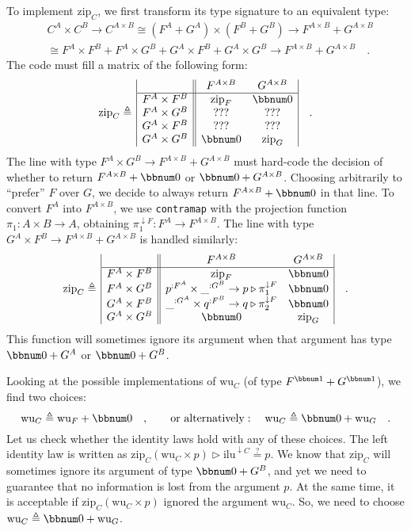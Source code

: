 To implement $\text{zip}_{C}$, we first transform its type signature
to an equivalent type:
\begin{align*}
 & C^{A}\times C^{B}\rightarrow C^{A\times B}\cong(F^{A}+G^{A})\times(F^{B}+G^{B})\rightarrow F^{A\times B}+G^{A\times B}\\
 & \cong F^{A}\times F^{B}+F^{A}\times G^{B}+G^{A}\times F^{B}+G^{A}\times G^{B}\rightarrow F^{A\times B}+G^{A\times B}\quad.
\end{align*}
The code must fill a matrix of the following form:
\[
\text{zip}_{C}\triangleq\,\begin{array}{|c||cc|}
 & F^{A\times B} & G^{A\times B}\\
\hline F^{A}\times F^{B} & \text{zip}_{F} & \bbnum 0\\
F^{A}\times G^{B} & \text{???} & \text{???}\\
G^{A}\times F^{B} & \text{???} & \text{???}\\
G^{A}\times G^{B} & \bbnum 0 & \text{zip}_{G}
\end{array}\quad.
\]
The line with type $F^{A}\times G^{B}\rightarrow F^{A\times B}+G^{A\times B}$
must hard-code the decision of whether to return $F^{A\times B}+\bbnum 0$
or $\bbnum 0+G^{A\times B}$. Choosing arbitrarily to \textsf{``}prefer\textsf{''}
$F$ over $G$, we decide to always return $F^{A\times B}+\bbnum 0$
in that line. To convert $F^{A}$ into $F^{A\times B}$, we use \lstinline!contramap!
with the projection function $\pi_{1}:A\times B\rightarrow A$, obtaining
$\pi_{1}^{\downarrow F}:F^{A}\rightarrow F^{A\times B}$. The line
with type $G^{A}\times F^{B}\rightarrow F^{A\times B}+G^{A\times B}$
is handled similarly:
\[
\text{zip}_{C}\triangleq\,\begin{array}{|c||cc|}
 & F^{A\times B} & G^{A\times B}\\
\hline F^{A}\times F^{B} & \text{zip}_{F} & \bbnum 0\\
F^{A}\times G^{B} & p^{:F^{A}}\times\_^{:G^{B}}\rightarrow p\triangleright\pi_{1}^{\downarrow F} & \bbnum 0\\
G^{A}\times F^{B} & \_^{:G^{A}}\times q^{:F^{B}}\rightarrow q\triangleright\pi_{2}^{\downarrow F} & \bbnum 0\\
G^{A}\times G^{B} & \bbnum 0 & \text{zip}_{G}
\end{array}\quad.
\]
This function will sometimes ignore its argument when that argument
has type $\bbnum 0+G^{A}$ or $\bbnum 0+G^{B}$.

Looking at the possible implementations of $\text{wu}_{C}$ (of type
$F^{\bbnum 1}+G^{\bbnum 1}$), we find two choices:
\[
\text{wu}_{C}\triangleq\text{wu}_{F}+\bbnum 0\quad,\quad\quad\text{or alternatively}:\quad\text{wu}_{C}\triangleq\bbnum 0+\text{wu}_{G}\quad.
\]
Let us check whether the identity laws hold with any of these choices.
The left identity law is written as $\text{zip}_{C}(\text{wu}_{C}\times p)\triangleright\text{ilu}^{\downarrow C}\overset{?}{=}p$.
We know that $\text{zip}_{C}$ will sometimes ignore its argument
of type $\bbnum 0+G^{B}$, and yet we need to guarantee that no information
is lost from the argument $p$. At the same time, it is acceptable
if $\text{zip}_{C}(\text{wu}_{C}\times p)$ ignored the argument $\text{wu}_{C}$.
So, we need to choose $\text{wu}_{C}\triangleq\bbnum 0+\text{wu}_{G}$. 


